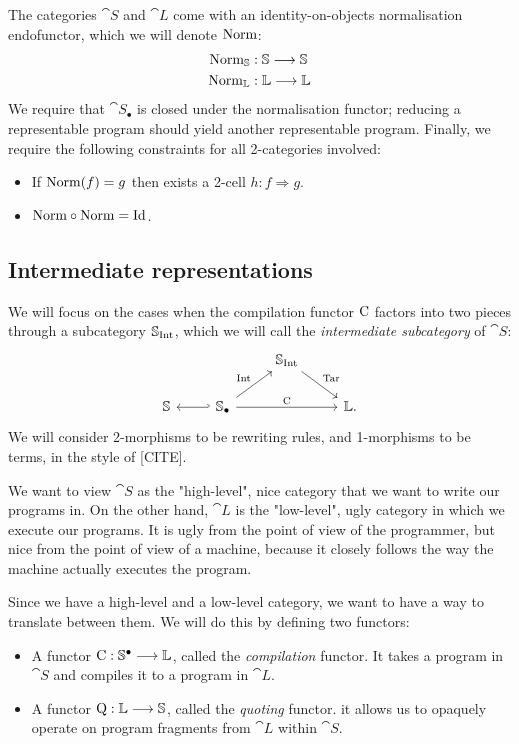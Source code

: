 The categories $\cat S$ and $\cat L$ come with an identity-on-objects
normalisation endofunctor, which we will denote $\mathrm{Norm}$:
\begin{align*}
  \mathrm{Norm}_{\mathbb S} & : \mathbb S \longrightarrow \mathbb S \\
  \mathrm{Norm}_{\mathbb L} & : \mathbb L \longrightarrow \mathbb L
\end{align*}
We require that $\cat S_{\bullet}$ is closed under the normalisation functor;
reducing a representable program should yield another representable program.
Finally, we require the following constraints for all 2-categories involved:
\begin{itemize}
  \item If $\mathrm{Norm} (f) = g$ then exists a 2-cell $h : f \Rightarrow g$.
  \item $\mathrm{Norm} \circ \mathrm{Norm} = \mathrm{Id}$.
\end{itemize}

\subsection{Intermediate representations}

We will focus on the cases when the compilation functor $\mathrm C$ factors into
two pieces through a subcategory $\mathbb S _{\mathrm{Int}}$, which we will call the
\emph{intermediate subcategory} of $\cat S$: $$
  \begin{tikzcd}
    & & \cat S_{\fun{Int}} \arrow[dr, "\fun{Tar}"] & \\
    \cat S & \arrow[l, hook'] \cat S_{\bullet} \arrow[ur, "\fun{Int}"] \arrow[rr, "\fun{C}"] & & \cat L .
  \end{tikzcd}
$$
We will consider 2-morphisms to be rewriting rules, and 1-morphisms to be
terms, in the style of [CITE].

We want to view $\cat S$ as the "high-level", nice category that we want to
write our programs in. On the other hand, $\cat L$ is the "low-level", ugly
category in which we execute our programs. It is ugly from the point of view of
the programmer, but nice from the point of view of a machine, because it
closely follows the way the machine actually executes the program.

Since we have a high-level and a low-level category, we want to have a way to
translate between them. We will do this by defining two functors:
\begin{itemize}
  \item A functor $\mathrm C : \mathbb S^{\bullet} \longrightarrow \mathbb L $, called the
        \emph{compilation} functor. It takes a program in $\cat S$ and compiles it to a
        program in $\cat L$.
  \item A functor $\mathrm Q : \mathbb L \longrightarrow \mathbb S $, called the \emph{quoting}
        functor. it allows us to opaquely operate on program fragments from $\cat L$
        within $\cat S$.
\end{itemize}

